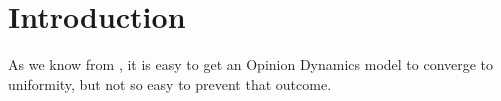 \section{Introduction}
\label{sec:intro}

As we know from \cite{sobkowicz_social_2023}, it is easy to get an Opinion
Dynamics model to converge to uniformity, but not so easy to prevent that
outcome.
